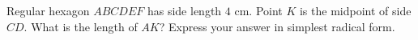 Regular hexagon $ABCDEF$ has side length $4$ cm. Point $K$ is the midpoint of side $CD$. What is the length of $AK$? Express your answer in simplest radical form.
